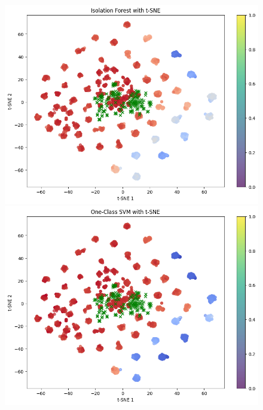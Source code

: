 \begin{figure}[ht]
  \centering
  \begin{minipage}[b]{0.45\linewidth}
    \centering
    \includegraphics[width=\linewidth]{Graphics/isolation_forest_Tsne.png} %
  \end{minipage}
  \hspace{0.5cm} %
  \begin{minipage}[b]{0.45\linewidth}
    \centering
    \includegraphics[width=\linewidth]{Graphics/one_class_svm_Tsne.png} %
  \end{minipage}
\end{figure}


